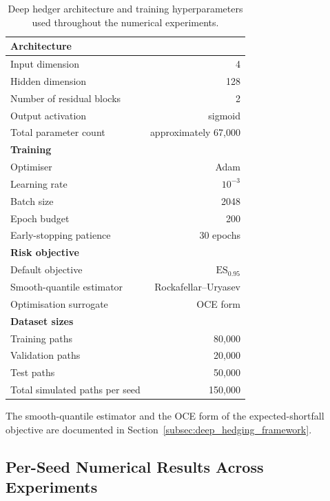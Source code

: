 \documentclass[12pt,a4paper]{article}
\theoremstyle{definition}
\theoremstyle{plain}
\theoremstyle{remark}
\theoremstyle{plain}
\begin{document}
\begin{table}[H]
\centering
\caption{Deep hedger architecture and training hyperparameters used
throughout the numerical experiments.}
\label{tab:appA_hyperparameters}
\begin{tabular}{lr}
\toprule
\textbf{Architecture} & \\
\midrule
Input dimension                  & 4 \\
Hidden dimension                 & 128 \\
Number of residual blocks        & 2 \\
Output activation                & sigmoid \\
Total parameter count            & approximately 67{,}000 \\
\midrule
\textbf{Training} & \\
\midrule
Optimiser                        & Adam \\
Learning rate                    & $10^{-3}$ \\
Batch size                       & 2048 \\
Epoch budget                     & 200 \\
Early-stopping patience          & 30 epochs \\
\midrule
\textbf{Risk objective} & \\
\midrule
Default objective                & $\mathrm{ES}_{0.95}$ \\
Smooth-quantile estimator        & Rockafellar--Uryasev \\
Optimisation surrogate           & OCE form \\
\midrule
\textbf{Dataset sizes} & \\
\midrule
Training paths                   & 80{,}000 \\
Validation paths                 & 20{,}000 \\
Test paths                       & 50{,}000 \\
Total simulated paths per seed   & 150{,}000 \\
\bottomrule
\end{tabular}
\end{table}

The smooth-quantile estimator and the OCE form of the
expected-shortfall objective are documented in
Section~\ref{subsec:deep_hedging_framework}.

\subsection{Per-Seed Numerical Results Across Experiments}
\label{app:per_seed_results}
\end{document}
